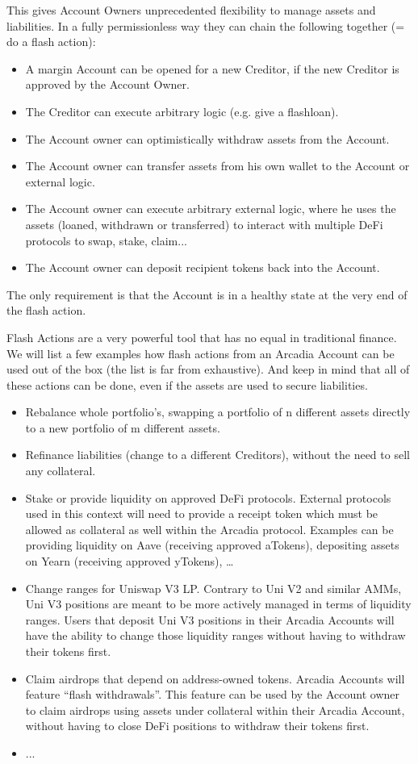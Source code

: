 \documentclass[sigconf,nonacm]{acmart}
\begin{document}
This gives Account Owners unprecedented flexibility to manage assets and liabilities.
In a fully permissionless way they can chain the following together (= do a flash action):
\begin{itemize}
    \item A margin Account can be opened for a new Creditor, if the new Creditor is approved by the Account Owner.
    \item The Creditor can execute arbitrary logic (e.g. give a flashloan).
    \item The Account owner can optimistically withdraw assets from the Account.
    \item The Account owner can transfer assets from his own wallet to the Account or external logic.
    \item The Account owner can execute arbitrary external logic, where he uses the assets (loaned, withdrawn or transferred) to interact with multiple DeFi protocols to swap, stake, claim...
    \item The Account owner can deposit recipient tokens back into the Account.
\end{itemize}
The only requirement is that the Account is in a healthy state at the very end of the flash action.

Flash Actions are a very powerful tool that has no equal in traditional finance.
We will list a few examples how flash actions from an Arcadia Account can be used out of the box (the list is far from exhaustive).
And keep in mind that all of these actions can be done, even if the assets are used to secure liabilities.

\begin{itemize}
    \item Rebalance whole portfolio's, swapping a portfolio of n different assets directly to a new portfolio of m different assets.
    \item Refinance liabilities (change to a different Creditors), without the need to sell any collateral.
    \item Stake or provide liquidity on approved DeFi protocols.
    External protocols used in this context will need to provide a receipt token which must be allowed as collateral as well within the Arcadia protocol.
    Examples can be providing liquidity on Aave (receiving approved aTokens), depositing assets on Yearn (receiving approved yTokens), …
    \item Change ranges for Uniswap V3 LP. Contrary to Uni V2 and similar AMMs, Uni V3 positions are meant to be more actively managed in terms of liquidity ranges.
    Users that deposit Uni V3 positions in their Arcadia Accounts will have the ability to change those liquidity ranges without having to withdraw their tokens first.
    \item Claim airdrops that depend on address-owned tokens. Arcadia Accounts will feature “flash withdrawals”.
    This feature can be used by the Account owner to claim airdrops using assets under collateral within their Arcadia Account, without having to close DeFi positions to withdraw their tokens first.
    \item ...
\end{itemize}
\end{document}

